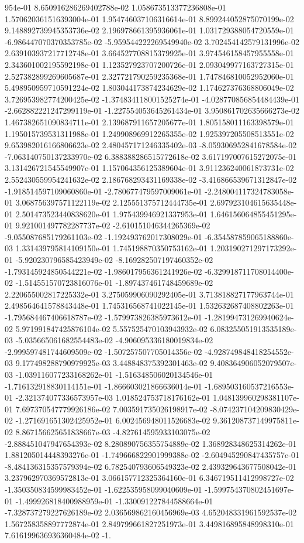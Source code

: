 954e-01	8.650916286269402788e-02	1.058673513377236808e-01	1.570620361516393004e-01	1.954746037106316614e-01	8.899244052875070199e-02	9.148892739945353736e-02	2.196978661395936061e-01	1.031729388054720559e-01	-6.986447070370353785e-02	-5.959544222269549940e-02	3.702454142579131996e-02	2.639103937217712748e-01	3.664527708815379925e-01	3.974546158457955558e-01	2.343601002195592198e-01	1.123527923707200726e-01	2.093049977163727315e-01	2.527382899269605687e-01	2.327721790259235368e-01	1.747846810052952060e-01	5.498950959710591224e-02	1.803044173874234629e-02	1.174627376368806049e-02	3.726953982774200425e-02	-1.374834118001525274e-01	-4.028770856854484439e-01	-2.662882221247299119e-01	-1.227554053645261434e-01	3.950861702635666273e-02	1.467382651090834711e-01	2.139687911657205677e-01	1.805158011163398579e-01	1.195015739531311988e-01	1.249908969912265355e-02	1.925397205508513551e-02	9.653982016166806623e-02	2.480457171246335402e-03	-8.059306952841678584e-02	-7.063140750137233970e-02	6.388388286515772618e-02	3.617197007615272075e-01	3.131426721545549907e-01	1.157064356125389604e-01	3.911236240061873731e-02	2.552430559954241632e-02	2.186768293431169338e-02	-3.416866539671312847e-02	-1.918514597109060860e-01	-2.780677479597009061e-01	-2.248004117324783058e-01	3.068756397571122119e-02	2.125551375712444735e-01	2.697923104615635448e-01	2.501473523440838620e-01	1.975439946921337953e-01	1.646156064855451295e-01	9.921001497782287737e-02	-2.610151046344265369e-02	-9.055087685179261103e-02	-1.192493762017308029e-01	-6.354587859065188860e-03	1.331439795814109150e-01	1.745198870350753162e-01	1.203190271297173292e-01	-5.920230796585423949e-02	-8.169282507197460352e-02	-1.793145924850544221e-02	-1.986017956361241926e-02	-6.329918711708014400e-02	-1.514551570723816076e-01	-1.897437461748459689e-02	2.220655002817225332e-01	3.275059906090292405e-01	3.713818827177963744e-01	2.498564641578843448e-01	1.745316568741022145e-01	1.532632687408802263e-01	-1.795684467406618787e-02	-1.579973826385973612e-01	-1.281994731269940624e-02	5.971991847425876104e-02	5.557525470103943932e-02	6.083255051913535189e-03	-5.035665061682554483e-02	-4.906095336180019834e-02	-2.999597481744609509e-02	-1.507257507705014356e-02	-4.928749848418254552e-03	9.177498288790979925e-03	3.448848375392301463e-02	9.408364906052079507e-03	-1.039116077233168262e-01	-1.516348506020134546e-01	-1.716132918830114151e-01	-1.866603021866636014e-01	-1.689503160537216553e-01	-2.321374077336573957e-03	1.018524753718176162e-01	1.048139960298381107e-01	7.697370547779926186e-02	7.003591735026198917e-02	-8.074237104209830429e-02	-1.271691651302425952e-01	6.002456948011526683e-02	9.361208737149975811e-02	8.867156625651838667e-03	-4.827614595933103075e-02	-2.888451047947654393e-02	8.280890756355754889e-02	1.368928348625314262e-01	1.881205014448393276e-01	-1.749666822901999388e-02	-2.604945290847435757e-01	-8.484136315357579394e-02	6.782540793606549323e-02	2.439329643677508042e-01	3.237962970369572813e-01	3.066157712325364160e-01	6.346719511412998727e-02	-1.350350834599983452e-01	-1.622535958099040609e-01	-1.599754370802451697e-01	-1.499926818400988959e-01	-1.330091227844588664e-01	-7.328737279227626189e-02	2.036569862160456969e-03	4.652048331961592537e-02	1.567258358897772874e-01	2.849799661827251973e-01	3.449816895848998310e-01	7.616199636936360484e-02	-1.
